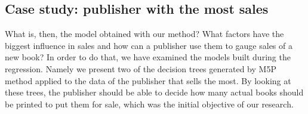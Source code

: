 \documentclass[a4paper,10pt,twocolumn,preprint,3p]{elsarticle}
\begin{document}
\begin{table*}[!ht]
\caption{Predicting Total sales for PublishingCo-UDLU11 (ReliefFAttributeEval-FS). Best values in bold.}
\centering{}%
\label{Table:case4results-RAE}
\end{table*}



\subsection{Case study: publisher with the most sales}
\label{subsec:decision_trees}

What is, then, the model obtained with our method? What factors have
the biggest influence in sales and how can a publisher use them to gauge
sales of a new book? In order to do that, we have examined the models
built during the regression. Namely we present two of the decision
trees generated by M5P method applied to the data of the publisher
that sells the most. By looking at these trees, the publisher should
be able to decide how many actual books should be printed to put them
for sale, which was the initial objective of our research.
\end{document}
